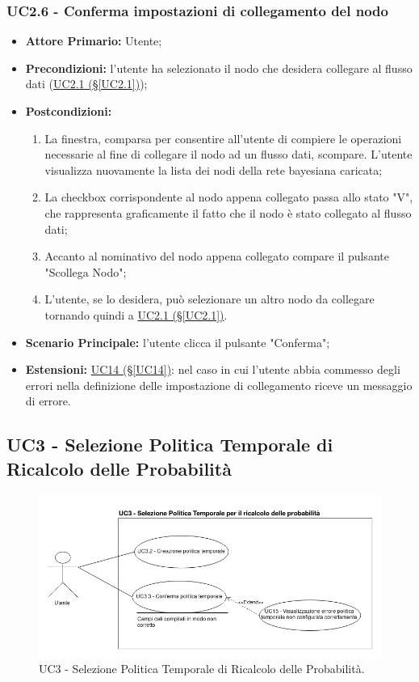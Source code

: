 \subsubsection{UC2.6 - Conferma impostazioni di collegamento del nodo}\label{UC2.6}
\begin{itemize}
\item \textbf{Attore Primario:} Utente;
\item \textbf{Precondizioni:} l'utente ha selezionato il nodo che desidera collegare al flusso dati 					(\hyperref[UC2.1]{UC2.1 (§\ref*{UC2.1})});
\item \textbf{Postcondizioni:}
	\begin{enumerate}
	\item La finestra, comparsa per consentire all'utente di compiere le operazioni necessarie al fine di collegare il 		nodo ad un flusso dati, scompare. L'utente visualizza nuovamente la lista dei nodi della rete bayesiana caricata;
	\item La checkbox corrispondente al nodo appena collegato passa allo stato "V", che rappresenta graficamente il fatto che il nodo è stato collegato al flusso dati;
	\item Accanto al nominativo del nodo appena collegato compare il pulsante "Scollega Nodo";
	\item L'utente, se lo desidera, può selezionare un altro nodo da collegare tornando quindi a \hyperref[UC2.1]{UC2.1 (§\ref*{UC2.1})}.
	\end{enumerate}
\item \textbf{Scenario Principale:} l'utente clicca il pulsante "Conferma";
\item \textbf{Estensioni:} \hyperref[UC14]{UC14 (§\ref*{UC14})}: nel caso in cui l'utente abbia commesso degli errori nella definizione delle impostazione di collegamento riceve un messaggio di errore.
\end{itemize}

\pagebreak

\subsection{UC3 - Selezione Politica Temporale di Ricalcolo delle Probabilità}\label{UC3}
\begin{figure}[H]
\centering
\includegraphics[scale=0.5]{./images/UC3.png}
\caption{UC3 - Selezione Politica Temporale di Ricalcolo delle Probabilità.}
\end{figure}

